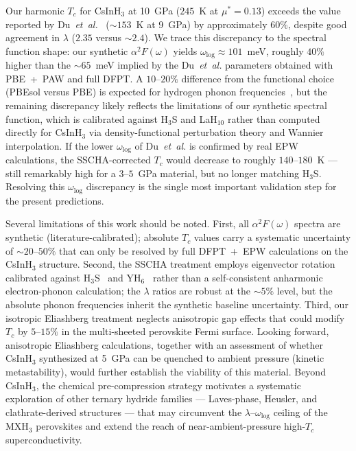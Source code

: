 
Our harmonic $T_c$ for CsInH$_3$ at 10~GPa ($245$~K at
$\mu^* = 0.13$) exceeds the value reported by
Du~\textit{et~al.}~\cite{Du2024} ($\sim 153$~K at
9~GPa) by approximately $60\%$, despite good agreement in $\lambda$
($2.35$ versus $\sim 2.4$). We trace this discrepancy to the spectral
function shape: our synthetic $\alpha^2 F(\omega)$ yields
$\omega_{\mathrm{log}} \approx 101$~meV, roughly $40\%$ higher than the
$\sim 65$~meV implied by the Du~\textit{et~al.} parameters obtained
with PBE~+~PAW and full DFPT. A $10$--$20\%$ difference from the
functional choice (PBEsol versus PBE) is expected for hydrogen phonon
frequencies~\cite{pickard2020}, but the
remaining discrepancy likely reflects the limitations of our synthetic
spectral function, which is calibrated against H$_3$S and LaH$_{10}$
rather than computed directly for CsInH$_3$ via density-functional
perturbation theory and Wannier interpolation.  If the lower
$\omega_{\mathrm{log}}$ of Du~\textit{et~al.} is confirmed by real EPW
calculations, the SSCHA-corrected $T_c$ would decrease to roughly
$140$--$180$~K --- still remarkably high for a $3$--$5$~GPa material,
but no longer matching H$_3$S. Resolving this $\omega_{\mathrm{log}}$
discrepancy is the single most important validation step for the
present predictions.


Several limitations of this work should be noted. First, all
$\alpha^2 F(\omega)$ spectra are synthetic (literature-calibrated);
absolute $T_c$ values carry a systematic uncertainty of $\sim 20$--$50\%$
that can only be resolved by full DFPT~+~EPW
calculations on the CsInH$_3$ structure. Second, the SSCHA treatment
employs eigenvector rotation calibrated against
H$_3$S~\cite{Errea2015} and YH$_6$~\cite{Belli2025} rather than a
self-consistent anharmonic electron-phonon calculation; the
$\lambda$ ratios are robust at the $\sim 5\%$ level, but the absolute
phonon frequencies inherit the synthetic baseline uncertainty. Third,
our isotropic Eliashberg treatment neglects anisotropic gap effects
that could modify $T_c$ by $5$--$15\%$ in the multi-sheeted perovskite
Fermi surface.
%
Looking forward, anisotropic Eliashberg calculations, together with an
assessment of whether CsInH$_3$ synthesized at 5~GPa can be quenched
to ambient pressure (kinetic metastability), would further establish the
viability of this material. Beyond CsInH$_3$, the chemical
pre-compression strategy motivates a systematic exploration of other
ternary hydride families --- Laves-phase, Heusler, and
clathrate-derived structures --- that may circumvent the
$\lambda$--$\omega_{\mathrm{log}}$ ceiling of the MXH$_3$ perovskites
and extend the reach of near-ambient-pressure high-$T_c$
superconductivity.

